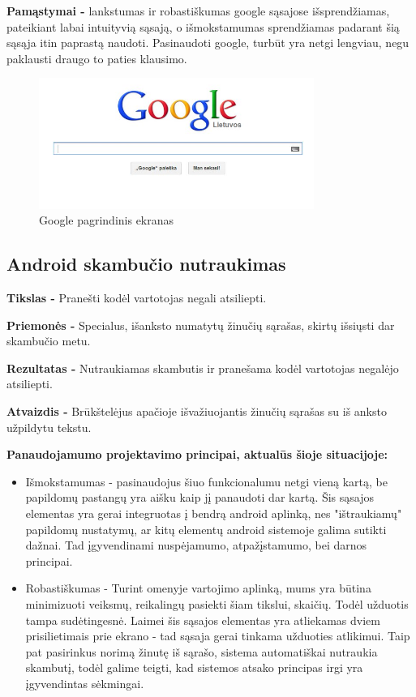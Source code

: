 ﻿\documentclass[a4paper, 12pt]{article}
\begin{document}
		\textbf{Pamąstymai -}
		lankstumas ir robastiškumas google sąsajose išsprendžiamas, pateikiant labai intuityvią sąsają, o išmokstamumas sprendžiamas padarant šią sąsąja itin paprastą naudoti.
		Pasinaudoti google, turbūt yra netgi lengviau, negu paklausti draugo to paties klausimo.

		\begin{figure}[h]
		\centering
		\includegraphics[width=0.8\textwidth]{images/google.jpg}
		\caption{Google pagrindinis ekranas}
		\label{korteles}
		\end{figure}

	\subsection{Android skambučio nutraukimas}
		\textbf{Tikslas -}
		Pranešti kodėl vartotojas negali atsiliepti.

		\textbf{Priemonės -}
		Specialus, išanksto numatytų žinučių sąrašas, skirtų išsiųsti dar skambučio metu.

		\textbf{Rezultatas -}
		Nutraukiamas skambutis ir pranešama kodėl vartotojas negalėjo atsiliepti.

		\textbf{Atvaizdis -}
		Brūkštelėjus apačioje išvažiuojantis žinučių sąrašas su iš anksto užpildytu tekstu.

		\textbf{Panaudojamumo projektavimo principai, aktualūs šioje situacijoje:}
		\begin{itemize}
		\item Išmokstamumas - pasinaudojus šiuo funkcionalumu netgi vieną kartą, be papildomų pastangų yra aišku kaip jį panaudoti dar kartą.
		Šis sąsajos elementas yra gerai integruotas į bendrą android aplinką, nes "ištraukiamų" papildomų nustatymų, ar kitų elementų android sistemoje galima sutikti dažnai.
		Tad įgyvendinami nuspėjamumo, atpažįstamumo, bei darnos principai.
		\item Robastiškumas - Turint omenyje vartojimo aplinką, mums yra būtina minimizuoti veiksmų, reikalingų pasiekti šiam tikslui, skaičių.
		Todėl užduotis tampa sudėtingesnė.
		Laimei šis sąsajos elementas yra atliekamas dviem prisilietimais prie ekrano - tad sąsaja gerai tinkama užduoties atlikimui.
		Taip pat pasirinkus norimą žinutę iš sąrašo, sistema automatiškai nutraukia skambutį, todėl galime teigti, kad sistemos atsako principas irgi yra įgyvendintas sėkmingai.
		\end{itemize}
\end{document}
